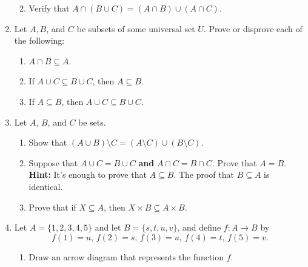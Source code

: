 \documentclass[12pt]{article}
\newcommand{\points}[1]{\marginpar{\hspace{24pt}[#1]}}
\begin{document}
\begin{enumerate}
\begin{enumerate}
\vspace{2in}

 \item Verify that $A\cap (B\cup C) = (A\cap B)\cup (A\cap C)$. \points{3}

\end{enumerate}
\newpage

\item Let $A, B$, and $C$ be subsets of some universal set $U$. Prove or disprove each of the following:
\begin{enumerate}
 \item $A\cap B\subseteq A$. \points{3}

 \vspace{2.5in}

 \item If $A\cup C\subseteq B\cup C$, then $A\subseteq B$. \points{3}

\vspace{2.5in}

 \item If $A\subseteq B$, then $A\cup C\subseteq B\cup C$. \points{3}
\end{enumerate}
\newpage

\item Let $A$, $B$, and $C$ be sets. 
\begin{enumerate}
 \item Show that $(A\cup B)\setminus C = (A\setminus C)\cup (B\setminus C)$. \points{3}

\vspace{2.5in}

 \item Suppose that $A\cup C=B\cup C$ {\bf and} $A\cap C=B\cap C$. Prove that $A=B$. \points{4}\\
{\bf Hint:} It's enough to prove that $A\subseteq B$. The proof that $B\subseteq A$ is identical.

\vspace{3.5in}

 \item Prove that if $X\subseteq A$, then $X\times B\subseteq A\times B$. \points{4}


\end{enumerate}
\newpage

\item Let $A=\{1,2,3,4,5\}$ and let $B = \{s,t,u,v\}$, and define $f:A\to B$ by
\[
 f(1) = u, \, f(2) = s,\, f(3) = u,\, f(4) = t,\, f(5) = v.
\]
\begin{enumerate}
 \item Draw an arrow diagram that represents the function $f$. \points{2}


\end{enumerate}
\end{enumerate}
\end{document}
